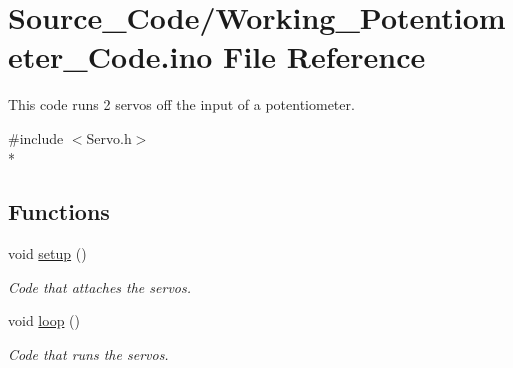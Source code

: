 \hypertarget{_working___potentiometer___code_8ino}{\section{Source\-\_\-\-Code/\-Working\-\_\-\-Potentiometer\-\_\-\-Code.ino File Reference}
\label{_working___potentiometer___code_8ino}
}


This code runs 2 servos off the input of a potentiometer.  


{\ttfamily \#include $<$Servo.\-h$>$}\\*
\subsection*{Functions}
\begin{DoxyCompactItemize}
\item 
void \hyperlink{_working___potentiometer___code_8ino_a4fc01d736fe50cf5b977f755b675f11d}{setup} ()
\begin{DoxyCompactList}\small\item\em Code that attaches the servos. \end{DoxyCompactList}\item 
void \hyperlink{_working___potentiometer___code_8ino_afe461d27b9c48d5921c00d521181f12f}{loop} ()
\begin{DoxyCompactList}\small\item\em Code that runs the servos. \end{DoxyCompactList}\end{DoxyCompactItemize}

